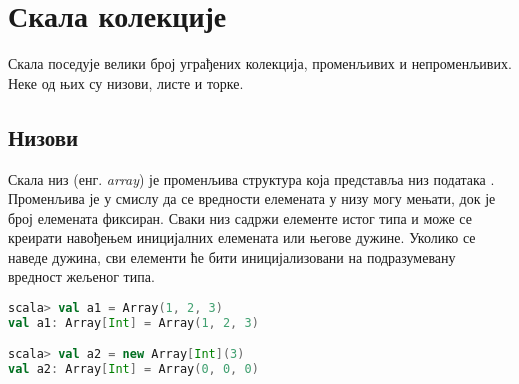 \documentclass[12pt,oneside]{memoir}
\begin{document}
%
%
%

\section{Скала колекције}
\label{sec:scala_coll}

Скала поседује велики број уграђених колекција, променљивих и непроменљивих. Неке од њих су низови, листе и торке.

\subsection{Низови}
\label{subsec:scala_arrays}

Скала низ (енг. \textit{array}) је променљива структура која представља низ података \cite{scala_prog}. Променљива је у смислу да се вредности елемената у низу могу мењати, док је број елемената фиксиран. Сваки низ садржи елементе истог типа и може се креирати навођењем иницијалних елемената или његове дужине. Уколико се наведе дужина, сви елементи ће бити иницијализовани на подразумевану вредност жељеног типа.

\begin{lstlisting}[language=Scala, caption={Инстанцирање низа у Скали}, label={lst:scala_coll_array_example}, basicstyle=\small]
scala> val a1 = Array(1, 2, 3)
val a1: Array[Int] = Array(1, 2, 3)

scala> val a2 = new Array[Int](3)
val a2: Array[Int] = Array(0, 0, 0)
\end{lstlisting}
\end{document}
